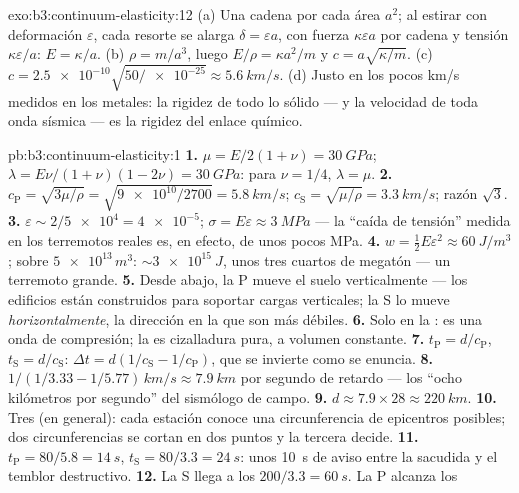 \begin{solution}{exo:b3:continuum-elasticity:12}
(a) Una cadena por cada área $a^2$; al estirar con deformación
$\varepsilon$, cada resorte se alarga $\delta = \varepsilon a$, con fuerza $\kappa
\varepsilon a$ por cadena y tensión $\kappa\varepsilon/a$: $E =
\kappa/a$. (b) $\rho = m/a^3$, luego $E/\rho = \kappa a^2/m$ y $c =
a\sqrt{\kappa/m}$. (c) $c = \num{2.5e-10}\sqrt{50/\num{e-25}} \approx
\qty{5.6}{km/s}$. (d) Justo en los pocos km/s medidos en los metales: la
rigidez de todo lo sólido --- y la velocidad de toda onda sísmica --- es la
rigidez del enlace químico.
\end{solution}

\begin{solution}{pb:b3:continuum-elasticity:1}
\textbf{1.} $\mu = E/2(1+\nu) = \qty{30}{GPa}$; $\lambda =
E\nu/(1+\nu)(1-2\nu) = \qty{30}{GPa}$: para $\nu = 1/4$, $\lambda =
\mu$.
\textbf{2.} $c_{\text{P}} = \sqrt{3\mu/\rho} = \sqrt{\num{9e10}/2700}
= \qty{5.8}{km/s}$; $c_{\text{S}} = \sqrt{\mu/\rho} =
\qty{3.3}{km/s}$; razón $\sqrt3$.
\textbf{3.} $\varepsilon \sim 2/\num{5e4} = \num{4e-5}$; $\sigma =
E\varepsilon \approx \qty{3}{MPa}$ --- la ``caída de tensión'' medida en
los terremotos reales es, en efecto, de unos pocos MPa.
\textbf{4.} $w = \tfrac12 E\varepsilon^2 \approx \qty{60}{J/m^3}$;
sobre $\num{5e13}{}\,\unit{m^3}$: $\sim\qty{3e15}{J}$, unos
tres cuartos de megatón --- un terremoto grande.
\textbf{5.} Desde abajo, la P mueve el suelo verticalmente --- los
edificios están construidos para soportar cargas verticales; la S lo mueve
\emph{horizontalmente}, la dirección en la que son más débiles.
\textbf{6.} Solo en la : es una onda de compresión; la  es
cizalladura pura, a volumen constante.
\textbf{7.} $t_{\text{P}} = d/c_{\text{P}}$, $t_{\text{S}} =
d/c_{\text{S}}$: $\Delta t = d(1/c_{\text{S}} - 1/c_{\text{P}})$,
que se invierte como se enuncia.
\textbf{8.} $1/(1/3.33 - 1/5.77)\,\unit{km/s} \approx
\qty{7.9}{km}$ por segundo de retardo --- los ``ocho kilómetros por
segundo'' del sismólogo de campo.
\textbf{9.} $d \approx 7.9 \times 28 \approx \qty{220}{km}$.
\textbf{10.} Tres (en general): cada estación conoce una circunferencia de
epicentros posibles; dos circunferencias se cortan en dos puntos y la
tercera decide.
\textbf{11.} $t_{\text{P}} = 80/5.8 = \qty{14}{s}$, $t_{\text{S}} =
80/3.3 = \qty{24}{s}$: unos \qty{10}{s} de aviso entre la sacudida y el
temblor destructivo.
\textbf{12.} La S llega a los $200/3.3 = \qty{60}{s}$. La P alcanza los

\end{solution}
